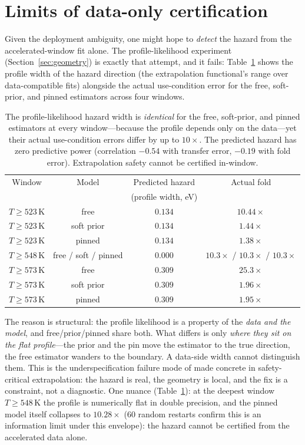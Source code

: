 \documentclass{article}
\begin{document}
\section{Limits of data-only certification}

Given the deployment ambiguity, one might hope to \emph{detect} the hazard from
the accelerated-window fit alone. The profile-likelihood experiment
(Section~\ref{sec:geometry}) is exactly that attempt, and it fails:
Table~\ref{tab:cert} shows the profile width of the hazard direction (the
extrapolation functional's range over data-compatible fits) alongside the
actual use-condition error for the free, soft-prior, and pinned estimators
across four windows.

\begin{table}[t]
\centering\small
\begin{tabular}{cccc}
\toprule
Window & Model & Predicted hazard & Actual fold \\
 & & (profile width, eV) & \\
\midrule
$T\ge523$\,K & free & $0.134$ & $10.44\times$ \\
$T\ge523$\,K & soft prior & $0.134$ & $1.44\times$ \\
$T\ge523$\,K & pinned & $0.134$ & $1.38\times$ \\
$T\ge548$\,K & free / soft / pinned & $0.000$ & $10.3\times$ / $10.3\times$ / $10.3\times$ \\
$T\ge573$\,K & free & $0.309$ & $25.3\times$ \\
$T\ge573$\,K & soft prior & $0.309$ & $1.96\times$ \\
$T\ge573$\,K & pinned & $0.309$ & $1.95\times$ \\
\bottomrule
\end{tabular}
\caption{The profile-likelihood hazard width is \emph{identical} for the free,
soft-prior, and pinned estimators at every window---because the profile depends
only on the data---yet their actual use-condition errors differ by up to
$10\times$. The predicted hazard has zero predictive power (correlation $-0.54$
with transfer error, $-0.19$ with fold error). Extrapolation safety cannot be
certified in-window.}
\label{tab:cert}
\end{table}

The reason is structural: the profile likelihood is a property of the \emph{data
and the model}, and free/prior/pinned share both. What differs is only
\emph{where they sit on the flat profile}---the prior and the pin move the
estimator to the true direction, the free estimator wanders to the boundary. A
data-side width cannot distinguish them. This is the underspecification failure
mode of \citet{damour20} made concrete in safety-critical extrapolation: the
hazard is real, the geometry is local, and the fix is a constraint, not a
diagnostic. One nuance (Table~\ref{tab:cert}): at the deepest window
$T\ge548$\,K the profile is numerically flat in double precision, and the
pinned model itself collapses to $10.28\times$ (60 random restarts confirm this
is an information limit under this envelope): the hazard cannot be certified
from the accelerated data alone.
\end{document}
